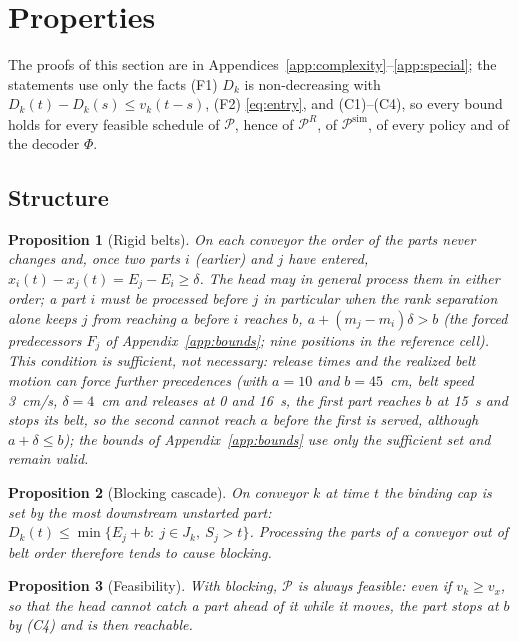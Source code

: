 \documentclass[11pt,a4paper]{article}
\theoremstyle{plain}
\newtheorem{proposition}{Proposition}
\theoremstyle{definition}
\theoremstyle{remark}
\newcommand{\Pb}{\mathcal{P}}
\newcommand{\Psim}{\Pb^{\mathrm{sim}}}
\begin{document}
\section{Properties}\label{sec:properties}
The proofs of this section are in Appendices~\ref{app:complexity}--\ref{app:special};
the statements use only the facts (F1) $D_k$ is non-decreasing with
$D_k(t)-D_k(s)\le v_k(t-s)$, (F2) \eqref{eq:entry}, and (C1)--(C4), so every bound holds
for every feasible schedule of $\Pb$, hence of $\Pb^R$, of $\Psim$, of every policy and of
the decoder $\Phi$.

\subsection{Structure}
\begin{proposition}[Rigid belts]\label{prop:rigid}
On each conveyor the order of the parts never changes and, once two parts $i$ (earlier)
and $j$ have entered, $x_i(t)-x_j(t)=E_j-E_i\ge\delta$. The head may in general process
them in either order; a part $i$ must be processed before $j$ in particular when the rank
separation alone keeps $j$ from reaching $a$ before $i$ reaches $b$, $a+(m_j-m_i)\delta>b$
(the forced predecessors $F_j$ of Appendix~\ref{app:bounds}; nine positions in the
reference cell). This condition is sufficient, not necessary: release times and the
realized belt motion can force further precedences (with $a=10$ and $b=45$~cm, belt speed
3~cm/s, $\delta=4$~cm and releases at 0 and 16~s, the first part reaches $b$ at 15~s and
stops its belt, so the second cannot reach $a$ before the first is served, although
$a+\delta\le b$); the bounds of Appendix~\ref{app:bounds} use only the sufficient set and
remain valid.
\end{proposition}
\begin{proposition}[Blocking cascade]\label{prop:cascade}
On conveyor $k$ at time $t$ the binding cap is set by the most downstream unstarted part:
$D_k(t)\le\min\{E_j+b:\ j\in J_k,\ S_j>t\}$. Processing the parts of a conveyor out of belt
order therefore tends to cause blocking.
\end{proposition}
\begin{proposition}[Feasibility]\label{prop:feasible}
With blocking, $\Pb$ is always feasible: even if $v_k\ge v_x$, so that the head cannot
catch a part ahead of it while it moves, the part stops at $b$ by (C4) and is then
reachable.
\end{proposition}
\end{document}
